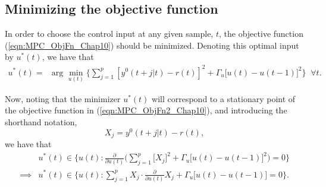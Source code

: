 \subsection{Minimizing the objective function}

In order to choose the control input at any given sample, $t$, the objective function (\ref{eqn:MPC_ObjFn_Chap10}) should be minimized. Denoting this optimal input by $u^*(t)$, we have that
\begin{align}
\label{eqn:MPC_ObjFn2_Chap10}
u^*(t) = &\text{arg } \min_{u(t)} \Bigg\{ \sum_{j=1}^{p} [y^0(t+j|t) - r(t)]^2  + \Gamma_u \big[ u(t) - u(t-1) \big]^2 \Bigg\} \; \; \forall t.
\end{align}

Now, noting that the minimizer $u^*(t)$ will correspond to a stationary point of the objective function in (\ref{eqn:MPC_ObjFn2_Chap10}), and introducing the shorthand notation,
\begin{equation}
X_j = y^0(t+j|t) - r(t),
\label{eqn:Xj_shorthand}
\end{equation}
we have that
\begin{align}
&u^*(t) \in   \Bigg\{ u(t): \frac{\partial}{\partial u(t)} \Bigg( \sum_{j=1}^{p} \big[ X_j \big] ^2  + \Gamma_u \big[ u(t) - u(t-1) \big]^2 \Bigg) = 0 \Bigg\}\\
\implies &u^*(t) \in \Bigg\{ u(t): \sum_{j=1}^{p} X_j \cdot \frac{\partial}{\partial u(t)} X_j  + \Gamma_u \big[ u(t) - u(t-1) \big] = 0 \Bigg\}. \label{eqn:MPC_ObjFn3_Chap10}
\end{align}

